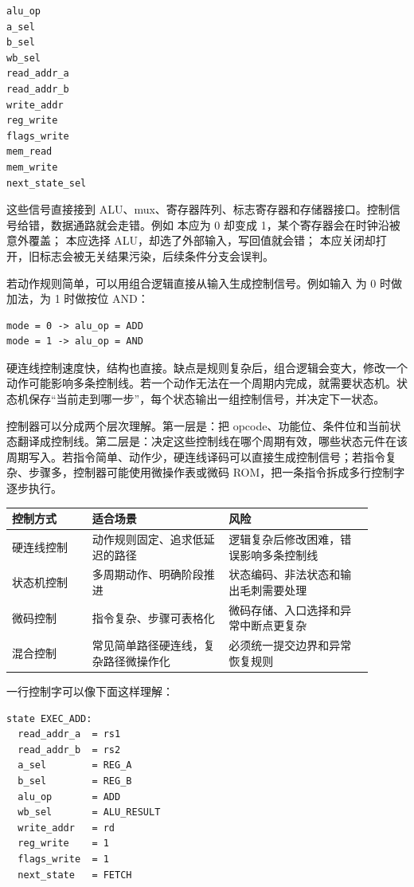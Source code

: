 \begin{lstlisting}
alu_op
a_sel
b_sel
wb_sel
read_addr_a
read_addr_b
write_addr
reg_write
flags_write
mem_read
mem_write
next_state_sel
\end{lstlisting}

这些信号直接接到 ALU、mux、寄存器阵列、标志寄存器和存储器接口。控制信号给错，数据通路就会走错。例如  本应为 0 却变成 1，某个寄存器会在时钟沿被意外覆盖； 本应选择 ALU，却选了外部输入，写回值就会错； 本应关闭却打开，旧标志会被无关结果污染，后续条件分支会误判。

若动作规则简单，可以用组合逻辑直接从输入生成控制信号。例如输入  为 0 时做加法，为 1 时做按位 AND：

\begin{lstlisting}
mode = 0 -> alu_op = ADD
mode = 1 -> alu_op = AND
\end{lstlisting}

硬连线控制速度快，结构也直接。缺点是规则复杂后，组合逻辑会变大，修改一个动作可能影响多条控制线。若一个动作无法在一个周期内完成，就需要状态机。状态机保存“当前走到哪一步”，每个状态输出一组控制信号，并决定下一状态。

控制器可以分成两个层次理解。第一层是：把 opcode、功能位、条件位和当前状态翻译成控制线。第二层是：决定这些控制线在哪个周期有效，哪些状态元件在该周期写入。若指令简单、动作少，硬连线译码可以直接生成控制信号；若指令复杂、步骤多，控制器可能使用微操作表或微码 ROM，把一条指令拆成多行控制字逐步执行。

\begin{longtable}{L{0.2\linewidth}L{0.34\linewidth}L{0.36\linewidth}}
\toprule
控制方式 & 适合场景 & 风险 \\
\midrule
硬连线控制 & 动作规则固定、追求低延迟的路径 & 逻辑复杂后修改困难，错误影响多条控制线 \\
状态机控制 & 多周期动作、明确阶段推进 & 状态编码、非法状态和输出毛刺需要处理 \\
微码控制 & 指令复杂、步骤可表格化 & 微码存储、入口选择和异常中断点更复杂 \\
混合控制 & 常见简单路径硬连线，复杂路径微操作化 & 必须统一提交边界和异常恢复规则 \\
\bottomrule
\end{longtable}

一行控制字可以像下面这样理解：

\begin{lstlisting}
state EXEC_ADD:
  read_addr_a  = rs1
  read_addr_b  = rs2
  a_sel        = REG_A
  b_sel        = REG_B
  alu_op       = ADD
  wb_sel       = ALU_RESULT
  write_addr   = rd
  reg_write    = 1
  flags_write  = 1
  next_state   = FETCH
\end{lstlisting}

